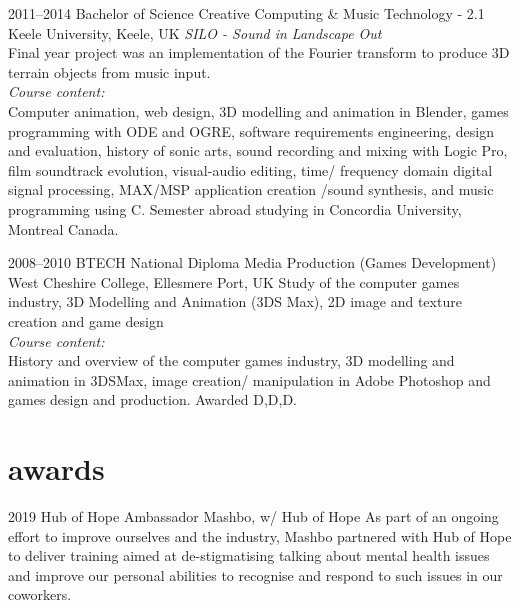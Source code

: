 \documentclass[]{friggeri-cv} %
\begin{document}
\begin{entrylist}


\entry
{2011--2014} 
{Bachelor of Science {\normalfont Creative Computing \& Music Technology - 2.1}} 
{Keele University, Keele, UK} 
{\emph{SILO - Sound in Landscape Out} \\ Final year project was an implementation of the Fourier transform to produce 3D terrain objects from music input.} \\
{\emph{Course content:} \\ Computer animation, web design, 3D modelling and animation in Blender, games programming with ODE and OGRE, software requirements engineering, design and evaluation, history of sonic arts, sound recording and mixing with Logic Pro, film soundtrack evolution, visual-audio editing, time/ frequency domain digital signal processing, MAX/MSP application creation /sound synthesis, and music programming using C. Semester abroad studying in Concordia University, Montreal Canada.}


\entry
{2008--2010}
{BTECH National Diploma {\normalfont Media Production (Games Development)}}
{West Cheshire College, Ellesmere Port, UK}
{Study of the computer games industry, 3D Modelling and Animation (3DS
Max), 2D image and texture creation and game design} \\
{\emph{Course content:} \\
History and overview of the computer games industry, 3D modelling and animation
in 3DSMax, image creation/ manipulation in Adobe Photoshop and
games design and production. Awarded D,D,D.}


\end{entrylist}




\section{awards}

\begin{entrylist}


\entry
{2019}
{Hub of Hope Ambassador}
{Mashbo, w/ Hub of Hope}
{As part of an ongoing effort to improve ourselves and the industry, Mashbo 
partnered with Hub of Hope to deliver training aimed at de-stigmatising talking
about mental health issues and improve our personal abilities to recognise and 
respond to such issues in our coworkers.}



\end{entrylist}
\end{document}
